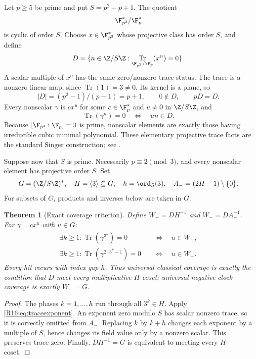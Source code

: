 \documentclass[11pt,a4paper]{article}
\newtheorem{theorem}{Theorem}[section]
\theoremstyle{definition}\newtheorem{definition}[theorem]{Definition}
\theoremstyle{remark}\newtheorem{remark}[theorem]{Remark}
\DeclareMathOperator{\Tr}{Tr}\DeclareMathOperator{\tr}{tr}\DeclareMathOperator{\Nm}{N}
\begin{document}
Let $p\ge5$ be prime and put $S=p^2+p+1$. The quotient
\[
 \F_{p^3}^{*}/\F_p^{*}
\]
is cyclic of order $S$. Choose $x\in\F_{p^3}^{*}$ whose projective class
has order $S$, and define
\[
 D=\{n\in\Z/S\Z:\Tr_{\F_{p^3}/\F_p}(x^n)=0\}.
\]
A scalar multiple of $x^n$ has the same zero/nonzero trace status.
The trace is a nonzero linear map, since $\Tr(1)=3\ne0$. Its kernel is a
plane, so
\begin{equation}\label{R16:eq:Dproperties}
 |D|=(p^2-1)/(p-1)=p+1,\qquad 0\notin D,\qquad pD=D.
\end{equation}
Every nonscalar $\gamma$ is $c x^u$ for some $c\in\F_p^*$ and
$u\ne0$ in $\Z/S\Z$, and
\begin{equation}\label{R16:eq:traceexponent}
 \Tr(\gamma^n)=0\quad\Longleftrightarrow\quad un\in D.
\end{equation}
Because $[\F_{p^3}:\F_p]=3$ is prime, nonscalar elements are exactly
those having irreducible cubic minimal polynomial. These elementary
projective trace facts are the standard Singer construction; see
\cite[\S1.2 and Corollary 1.2]{MRS}.

Suppose now that $S$ is prime. Necessarily $p\equiv2\pmod3$, and every
nonscalar element has projective order $S$. Set
\[
 G=(\Z/S\Z)^*,\quad H=\langle3\rangle\subseteq G,
 \quad h=\ord_S(3),\quad A_-=(2H-1)\setminus\{0\}.
\]
For subsets of $G$, products and inverses below are taken in $G$.

\begin{theorem}[Exact coverage criterion]\label{R16:thm:coverage}
Define $W_+=DH^{-1}$ and $W_-=DA_-^{-1}$. For
$\gamma=cx^u$ with $u\in G$:
\begin{align*}
 \exists k\ge1:\Tr(\gamma^{3^k})=0
   &\quad\Longleftrightarrow\quad u\in W_+,\\
 \exists k\ge1:\Tr(\gamma^{2\cdot3^k-1})=0
   &\quad\Longleftrightarrow\quad u\in W_-.
\end{align*}
Every hit recurs with index gap $h$. Thus universal classical coverage is
exactly the condition that $D$ meet every multiplicative $H$-coset;
universal negative-clock coverage is exactly $W_-=G$.
\end{theorem}
\begin{proof}
The phases $k=1,\ldots,h$ run through all $3^k\in H$. Apply
\eqref{R16:eq:traceexponent}. An exponent zero modulo $S$ has scalar nonzero
trace, so it is correctly omitted from $A_-$. Replacing $k$ by $k+h$
changes each exponent by a multiple of $S$, hence changes its field value
only by a nonzero scalar. This preserves trace zero. Finally,
$DH^{-1}=G$ is equivalent to meeting every $H$-coset.
\end{proof}
\end{document}
